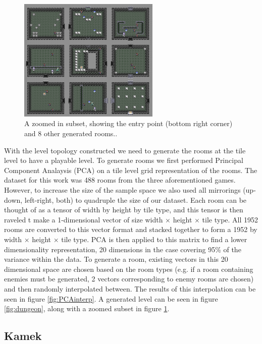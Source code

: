 \documentclass[12pt]{report}
\begin{document}
\begin{figure}[htbp!]
\centering
    \includegraphics[width=0.6\textwidth]{figures/lttp1_zoom.png}
    \caption{A zoomed in subset, showing the entry point (bottom right corner) and 8 other generated rooms..}
  \label{fig:dungeon_zoom}
\end{figure}
With the level topology constructed we need to generate the rooms at the tile level to have a playable level.  To generate rooms we first performed Principal Component Analaysis (PCA) on a tile level grid representation of the rooms. The dataset for this work was 488 rooms from the three aforementioned games.  However, to increase the size of the sample space we also used all mirrorings (up-down, left-right, both) to quadruple the size of our dataset. Each room can be thought of as a tensor of width by height by tile type, and this tensor is then raveled t make a 1-dimensional vector of size width $\times$ height $\times$ tile type.  All 1952 rooms are converted to this vector format and stacked together to form a 1952 by width $\times$ height $\times$ tile type.  PCA is then applied to this matrix to find a lower dimensionality representation, 20 dimensions in the case covering 95\% of the variance within the data.  To generate a room, existing vectors in this 20 dimensional space are chosen based on the room types (e.g. if a room containing enemies must be generated, 2 vectors corresponding to enemy rooms are chosen) and then randomly interpolated between.  The results of this interpolation can be seen in figure \ref{fig:PCAinterp}. A generated level can be seen in figure \ref{fig:dungeon}, along with a zoomed subset in figure \ref{fig:dungeon_zoom}.

\subsection*{Kamek}
\end{document}
